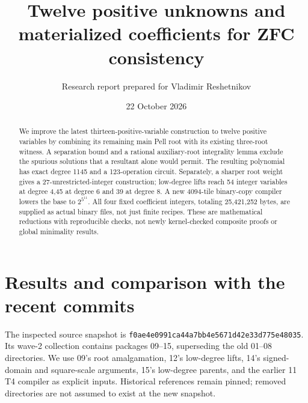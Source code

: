\documentclass[11 pt]{article}
\title{Twelve positive unknowns and materialized coefficients for ZFC consistency}
\author{Research report prepared for Vladimir Reshetnikov}
\date{22 October 2026}
\begin{document}
\maketitle
\begin{abstract}
We improve the latest thirteen-positive-variable construction to twelve positive variables by combining its remaining main Pell root with its existing three-root witness. A separation bound and a rational auxiliary-root integrality lemma exclude the spurious solutions that a resultant alone would permit. The resulting polynomial has exact degree 1145 and a 123-operation circuit. Separately, a sharper root weight gives a 27-unrestricted-integer construction; low-degree lifts reach 54 integer variables at degree 4,45 at degree 6 and 39 at degree 8. A new 4094-tile binary-copy compiler lowers the base to $ 2^{5^{11}}$. All four fixed coefficient integers, totaling 25,421,252 bytes, are supplied as actual binary files, not just finite recipes. These are mathematical reductions with reproducible checks, not newly kernel-checked composite proofs or global minimality results.
\end{abstract}
\section{Results and comparison with the recent commits}
The inspected source snapshot is
\texttt{f0ae4e0991ca44a7bb4e5671d42e33d775e48035}.
Its wave-2 collection contains packages 09--15, superseding the old 01--08 directories. We use 09's root amalgamation, 12's low-degree lifts, 14's signed-domain and square-scale arguments, 15's low-degree parents, and the earlier 11 T4 compiler as explicit inputs. Historical references remain pinned; removed directories are not assumed to exist at the new snapshot.
\end{document}
